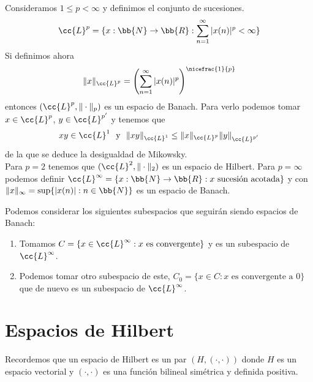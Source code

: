 \begin{ejemplo}
    Consideramos $1\leq p < \infty$ y definimos el conjunto de sucesiones.
    \begin{gather*}
        \cc{L}^p = \{ x : \bb{N} \to \bb{R} : \sum_{n=1}^{\infty}|x(n)|^p < \infty\}
    \end{gather*}
    Si definimos ahora
    \begin{gather*}
        \|x\|_{\cc{L}^p} = \left(\sum_{n=1}^{\infty}|x(n)|^p\right)^{\nicefrac{1}{p}}
    \end{gather*}
    entonces $(\cc{L}^p, \|\cdot\|_p)$ es un espacio de Banach. Para verlo podemos tomar $x\in \cc{L}^p$, $y\in \cc{L}^{p'}$ y tenemos que 
    \begin{gather*}
        xy\in \cc{L}^1 \text{\ \  y\ \  } \|xy\|_{\cc{L}^1} \leq \|x\|_{\cc{L}^p} \|y\|_{\cc{L}^{p'}}
    \end{gather*} de la que se deduce la desigualdad de Mikowsky.\\

    Para $p=2$ tenemos que $(\cc{L}^2, \|\cdot\|_2)$ es un espacio de Hilbert.     Para $p=\infty$ podemos definir $\cc{L}^{\infty} = \{x : \bb{N} \to \bb{R} : x \text{ sucesión acotada}\}$ y con $\|x\|_\infty = \sup\{|x(n)| : n\in \bb{N}\}$ es un espacio de Banach.
\end{ejemplo}

\begin{ejemplo} Podemos considerar los siguientes subespacios que seguirán siendo espacios de Banach:
    \begin{enumerate}
        \item Tomamos $C = \{x\in \cc{L}^{\infty} : x \text{ es convergente}\}$ y es un subespacio de $\cc{L}^\infty$. 
        \item Podemos tomar otro subespacio de este, $C_0 = \{x\in C : x \text{ es convergente a } 0\}$ que de nuevo es un subespacio de $\cc{L}^{\infty}$.
    \end{enumerate}    
\end{ejemplo}

\section{Espacios de Hilbert}

Recordemos que un espacio de Hilbert es un par $(H, (\cdot, \cdot))$ donde $H$ es un espacio vectorial y $(\cdot, \cdot)$ es una función bilineal simétrica y definida positiva.

